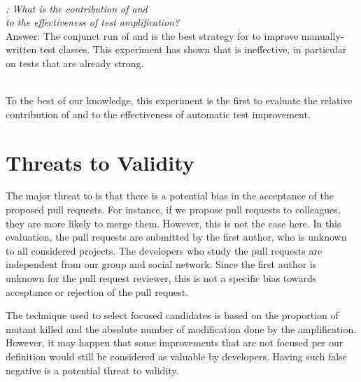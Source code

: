 ~\\

\begin{mdframed}
	\textit{\rqAmplVersusIAmpl: What is the contribution of \Iampl{} and \\\Aampl{} to the effectiveness of test amplification?}\\
	Answer: The conjunct run of \Iampl{} and \Aampl{} is the best strategy for \dspot{} to improve manually-written test classes. This experiment has shown that \Aampl{} is ineffective, in particular on tests that are already strong.
\end{mdframed}
~\\

To the best of our knowledge, this experiment is the first to evaluate the relative contribution of \Iampl and \Aampl to the effectiveness of automatic test improvement.

\section{Threats to Validity}
\label{sec:threats}

\textbf{\rqpullrequest{}}
The major threat to \rqpullrequest{} is that there is a potential bias in the acceptance of the proposed pull requests.
For instance, if we propose pull requests to colleagues, they are more likely to merge them.
However, this is not the case here.
In this evaluation, the pull requests are submitted by the first author, who is unknown to all considered projects. 
The developers who study the \dspot pull requests are independent from our group and social network.
Since the first author is unknown for the pull request reviewer, this is not a specific bias towards acceptance or rejection of the pull request.

\textbf{\rqcandidates{}}
The technique used to select focused candidates is based on the proportion of mutant killed and the absolute number of modification done by  the amplification. However, it may happen that some improvements that are not focused per our definition would still be considered as valuable by developers. Having such false negative is a potential threat to validity.

